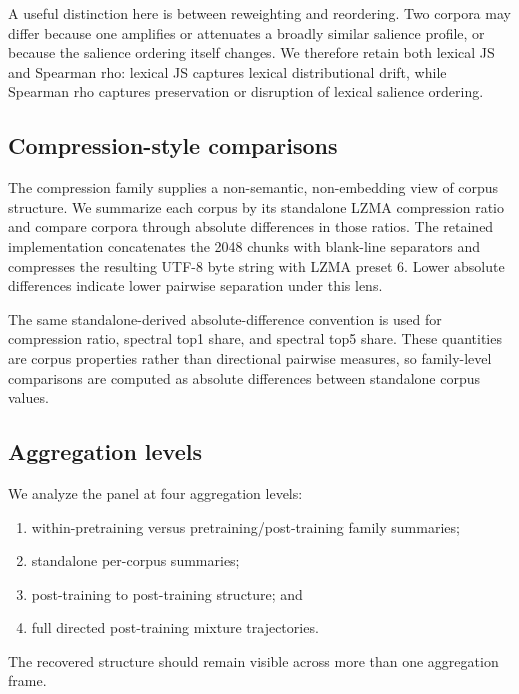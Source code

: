 \documentclass[11pt]{article}
\providecommand{\tightlist}{\setlength{\itemsep}{0pt}\setlength{\parskip}{0pt}}
\begin{document}
A useful distinction here is between reweighting and reordering. Two corpora may differ because one amplifies or attenuates a broadly similar salience profile, or because the salience ordering itself changes. We therefore retain both lexical JS and Spearman rho: lexical JS captures lexical distributional drift, while Spearman rho captures preservation or disruption of lexical salience ordering.

\subsection{Compression-style comparisons}\label{compression-style-comparisons}

The compression family supplies a non-semantic, non-embedding view of corpus structure. We summarize each corpus by its standalone LZMA compression ratio and compare corpora through absolute differences in those ratios. The retained implementation concatenates the 2048 chunks with blank-line separators and compresses the resulting UTF-8 byte string with LZMA preset 6. Lower absolute differences indicate lower pairwise separation under this lens.

The same standalone-derived absolute-difference convention is used for compression ratio, spectral top1 share, and spectral top5 share. These quantities are corpus properties rather than directional pairwise measures, so family-level comparisons are computed as absolute differences between standalone corpus values.

\subsection{Aggregation levels}\label{aggregation-levels}

We analyze the panel at four aggregation levels:

\begin{enumerate}
\def\labelenumi{\arabic{enumi}.}
\tightlist
\item
  within-pretraining versus pretraining/post-training family summaries;
\item
  standalone per-corpus summaries;
\item
  post-training to post-training structure; and
\item
  full directed post-training mixture trajectories.
\end{enumerate}

The recovered structure should remain visible across more than one aggregation frame.
\end{document}

